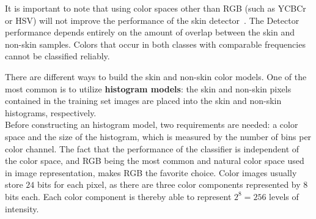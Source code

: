 \noindent It is important to note that using color spaces other than RGB (such as YCBCr or HSV) will not improve the performance of the skin detector~\cite{jones2002statistical}.
The Detector performance depends entirely on the amount of overlap between the skin and non-skin samples. Colors that occur in both classes with comparable frequencies cannot be classified reliably.


There are different ways to build the skin and non-skin color models.
One of the most common is to utilize \textbf{histogram models}: the skin and non-skin pixels contained in the training set images are placed into the skin and non-skin histograms, respectively.\\
Before constructing an histogram model, two requirements are needed: a color space and the size of the histogram, which is measured by the number of bins per color channel.
The fact that the performance of the classifier is independent of the color space, and RGB being the most common and natural color space used in image representation, makes RGB the favorite choice.
Color images usually store $24$ bits for each pixel, as there are three color components represented by $8$ bits each. Each color component is thereby able to represent $2^8=256$ levels of intensity.

